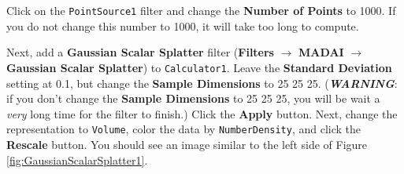 \documentclass[12pt]{article}
\newcommand{\filter}[1]{\textbf{#1}}
\newcommand{\filterinstance}[1]{\texttt{#1}}
\newcommand{\menu}[1]{\textbf{#1}}
\newcommand{\representation}[1]{\texttt{#1}}
\newcommand{\setting}[1]{\textbf{#1}}
\newcommand{\field}[1]{\texttt{#1}}
\begin{document}
Click on the \filterinstance{PointSource1} filter and change the \setting{Number of Points} to 1000. If you do not change this number to 1000, it will take too long to compute.

Next, add a \filter{Gaussian Scalar Splatter} filter (\menu{Filters} $\rightarrow$ \menu{MADAI} $\rightarrow$ \menu{Gaussian Scalar Splatter}) to \filterinstance{Calculator1}. Leave the \textbf{Standard Deviation} setting at 0.1, but change the \textbf{Sample Dimensions} to 25 25 25. (\emph{\textbf{WARNING}}: if you don't change the \textbf{Sample Dimensions} to 25 25 25, you will be wait a \emph{very} long time for the filter to finish.) Click the \setting{Apply} button. Next, change the representation to \representation{Volume}, color the data by \field{NumberDensity}, and click the \setting{Rescale} button. You should see an image similar to the left side of Figure \ref{fig:GaussianScalarSplatter1}.
\end{document}
